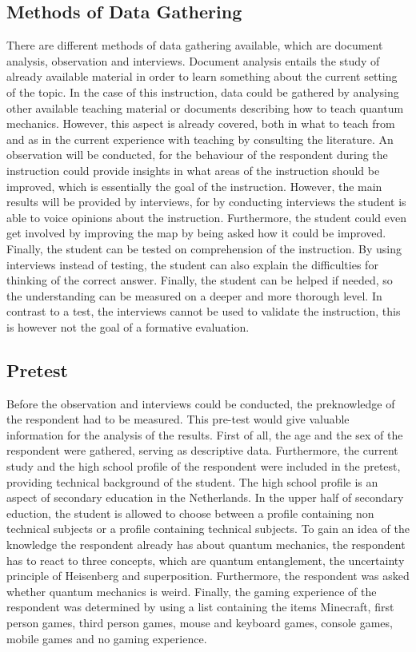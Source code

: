 \documentclass[11pt,twoside]{report} %
\begin{document}
\subsection{Methods of Data Gathering}

There are different methods of data gathering available, which are document analysis, observation and interviews. Document analysis entails the study of already available material in order to learn something about the current setting of the topic. In the case of this instruction, data could be gathered by analysing other available teaching material or documents describing how to teach quantum mechanics. However, this aspect is already covered, both in what to teach from  and as in the current experience with teaching by consulting the literature. An observation will be conducted, for the behaviour of the respondent during the instruction could provide insights in what areas of the instruction should be improved, which is essentially the goal of the instruction. However, the main results will be provided by interviews, for by conducting interviews the student is able to voice opinions about the instruction. Furthermore, the student could even get involved by improving the map by being asked how it could be improved. Finally, the student can be tested on comprehension of the instruction. By using interviews instead of testing, the student can also explain the difficulties for thinking of the correct answer. Finally, the student can be helped if needed, so the understanding can be measured on a deeper and more thorough level. In contrast to a test, the interviews cannot be used to validate the instruction, this is however not the goal of a formative evaluation.

\subsection{Pretest}

Before the observation and interviews could be conducted, the preknowledge of the respondent had to be measured. This pre-test would give valuable information for the analysis of the results. First of all, the age and the sex of the respondent were gathered, serving as descriptive data. Furthermore, the current study and the high school profile of the respondent were included in the pretest, providing technical background of the student. The high school profile is an aspect of secondary education in the Netherlands. In the upper half of secondary eduction, the student is allowed to choose between a profile containing non technical subjects or a profile containing technical subjects. To gain an idea of the knowledge the respondent already has about quantum mechanics, the respondent has to react to three concepts, which are quantum entanglement, the uncertainty principle of Heisenberg and superposition. Furthermore, the respondent was asked whether quantum mechanics is weird. Finally, the gaming experience of the respondent was determined by using a list containing the items Minecraft, first person games, third person games, mouse and keyboard games, console games, mobile games and no gaming experience.
\end{document}

